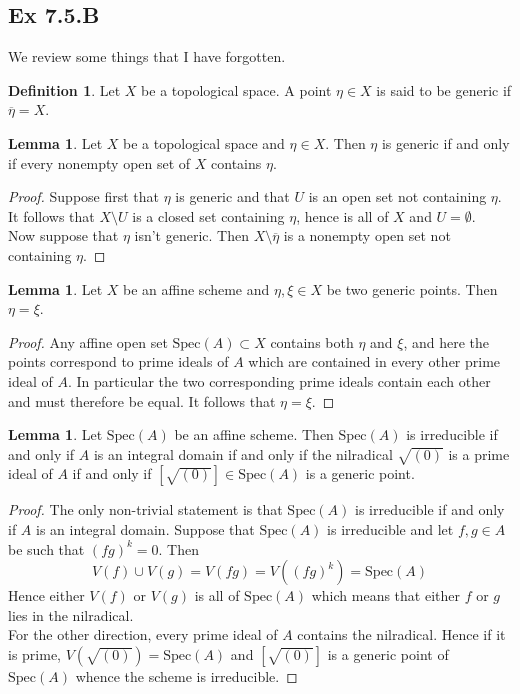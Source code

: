 \documentclass{article}
\theoremstyle{definition}
\newtheorem{definition}[theorem]{Definition}
\newtheorem{lemma}[theorem]{Lemma}
\newcommand{\Spec}{\text{Spec}}
\begin{document}
\subsection*{Ex 7.5.B}

We review some things that I have forgotten.
\begin{definition}
	Let $X$ be a topological space. A point $\eta \in X$ is said to
	be generic if $\overline{\eta} = X$.
\end{definition}

\begin{lemma}
	Let $X$ be a topological space and $\eta \in X$. Then $\eta$ is generic if
	and only if every nonempty open set of $X$ contains $\eta$.
\end{lemma}
\begin{proof}
	Suppose first that $\eta$ is generic and that $U$ is an open set not containing $\eta$. It
	follows that $X \setminus U$ is a closed set containing $\eta$, hence is all of $X$ and
	$U = \emptyset$. \\

	Now suppose that $\eta$ isn't generic. Then $X \setminus \overline{\eta}$
	is a nonempty open set not containing $\eta$.
\end{proof}
\begin{lemma}
	Let $X$ be an affine scheme and $\eta, \xi \in X$ be two generic points.
	Then $\eta = \xi$.
\end{lemma}
\begin{proof}
	Any affine open set $\Spec(A) \subset X$ contains both $\eta$ and $\xi$,
	and here the points correspond to prime ideals of $A$ which are contained
	in every other prime ideal of $A$. In particular the two corresponding
	prime ideals contain each other and must therefore be equal. It follows
	that $\eta = \xi$.
\end{proof}

\begin{lemma}
	Let $\Spec(A)$ be an affine scheme. Then $\Spec(A)$ is irreducible if and
	only if $A$ is an integral domain if and only if the nilradical
	$\sqrt{(0)}$ is a prime ideal of $A$ if and only if $[\sqrt{(0)}] \in
		\Spec(A)$ is a generic point.
\end{lemma}
\begin{proof}
	The only non-trivial statement is that $\Spec(A)$ is irreducible if and
	only if $A$ is an integral domain. Suppose that $\Spec(A)$ is irreducible
	and let $f, g \in A$ be such that $(fg)^{k} = 0$. Then
	\[
		V(f) \cup V(g)
		=
		V(fg)
		=
		V((fg)^{k})
		=
		\Spec(A)
	\]
	Hence either $V(f)$ or $V(g)$ is all of $\Spec(A)$ which means that either
	$f$ or $g$ lies in the nilradical. \\

	For the other direction, every prime ideal of $A$ contains the nilradical.
	Hence if it is prime, $V(\sqrt{(0)}) = \Spec(A)$ and $[\sqrt{(0)}]$ is a
	generic point of $\Spec(A)$ whence the scheme is irreducible.
\end{proof}
\end{document}

